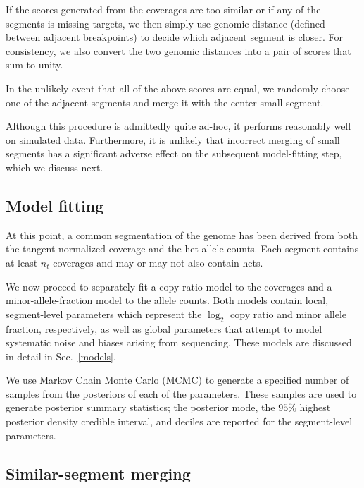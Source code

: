 \documentclass[nofootinbib,amssymb,amsmath]{revtex4}
\begin{document}
If the scores generated from the coverages are too similar or if any of the segments is missing targets, we then simply use genomic distance (defined between adjacent breakpoints) to decide which adjacent segment is closer.  For consistency, we also convert the two genomic distances into a pair of scores that sum to unity.

In the unlikely event that all of the above scores are equal, we randomly choose one of the adjacent segments and merge it with the center small segment.

Although this procedure is admittedly quite ad-hoc, it performs reasonably well on simulated data.  Furthermore, it is unlikely that incorrect merging of small segments has a significant adverse effect on the subsequent model-fitting step, which we discuss next.

\subsection{Model fitting} \label{model-fitting}

At this point, a common segmentation of the genome has been derived from both the tangent-normalized coverage and the het allele counts.  Each segment contains at least $n_t$ coverages and may or may not also contain hets.

We now proceed to separately fit a copy-ratio model to the coverages and a minor-allele-fraction model to the allele counts.  Both models contain local, segment-level parameters which represent the $\log_2$ copy ratio and minor allele fraction, respectively, as well as global parameters that attempt to model systematic noise and biases arising from sequencing.  These models are discussed in detail in Sec.~\ref{models}.

We use Markov Chain Monte Carlo (MCMC) to generate a specified number of samples from the posteriors of each of the parameters.  These samples are used to generate posterior summary statistics; the posterior mode, the $95\%$ highest posterior density credible interval, and deciles are reported for the segment-level parameters.

\subsection{Similar-segment merging} \label{similar-segment-merging}
\end{document}
